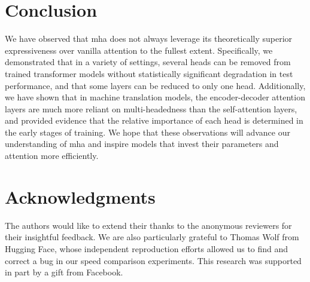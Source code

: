 \documentclass{article}
\newcommand{\paul}[1]{\ifcomments\textcolor{blue}{\bf\small [#1 --PM]}\else\fi}
\newif\ifcomments
\begin{document}


% 





\section{Conclusion}
\label{sec:conclusion}

We have observed that \ac{mha} does not always leverage its theoretically superior expressiveness over vanilla attention to the fullest extent. Specifically, we demonstrated that in a variety of settings, several heads can be removed from trained transformer models without statistically significant degradation in test performance, and that some layers can be reduced to only one head. Additionally, we have shown that in machine translation models, the encoder-decoder attention layers are much more reliant on multi-headedness than the self-attention layers, and provided evidence that the relative importance of each head is determined in the early stages of training.
We hope that these observations will advance our understanding of \ac{mha} and inspire models that invest their parameters and attention more efficiently.


\section*{Acknowledgments}
\label{sec:acknowledgments}

The authors would like to extend their thanks to the anonymous reviewers for their insightful feedback. We are also particularly grateful to Thomas Wolf from Hugging Face, whose independent reproduction efforts allowed us to find and correct a bug in our speed comparison experiments. This research was supported in part by a gift from Facebook.



% 

\appendix

\end{document}
